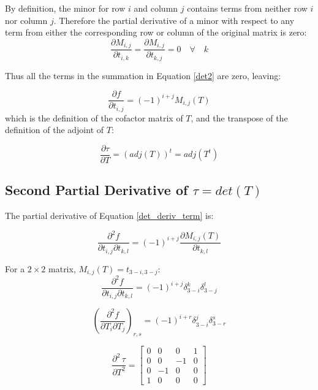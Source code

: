 \documentclass{report}
\begin{document}
\noindent By definition, the minor for row $i$ and column $j$ contains terms from neither row $i$ nor column $j$. Therefore the partial derivative of a minor with respect to any term from either the corresponding row or column of the original matrix is zero:
\begin{equation}\label{det3}
\frac{\partial M_{i,j}}{\partial t_{i,k}} = 
\frac{\partial M_{i,j}}{\partial t_{k,j}} = 0 \quad \forall \quad k
\end{equation}

\noindent Thus all the terms in the summation in Equation \ref{det2} are zero, leaving:

\begin{equation}\label{det_deriv_term}
\frac{\partial f}{\partial t_{i,j}} = (-1)^{i+j}M_{i,j}(T)
\end{equation}
which is the definition of the cofactor matrix of $T$, and the transpose of the definition of the adjoint of $T$:

\begin{equation}
\label{adjform}
\frac{\partial \tau}{\partial T} = (adj(T))^t = adj(T^t)
\end{equation}

\subsection{Second Partial Derivative of $\tau=det(T)$}

The partial derivative of Equation \ref{det_deriv_term} is:

\begin{equation}
\frac{\partial^2 f}{\partial t_{i,j} \partial t_{k,l}} = (-1)^{i+j}\frac{\partial M_{i,j}(T)}{\partial t_{k,l}}
\end{equation}

\noindent For a $2 \times 2$ matrix, $M_{i,j}(T) = t_{3-i,3-j}$:
\begin{equation}
\frac{\partial^2 f}{\partial t_{i,j} \partial t_{k,l}} = 
(-1)^{i+j} \delta_{3-i}^k \delta_{3-j}^l
\end{equation}

\begin{equation}
\left(\frac{\partial^2 f}{\partial T_i \partial T_j}\right)_{r,s} =
(-1)^{i+r} \delta_{3-i}^j \delta_{3-r}^s
\end{equation}

\begin{equation}
\label{2ndtau2d}
\frac{\partial^2 \, \tau}{\partial T^2} =
\left[ \begin{array}{cccc}
0 & 0 & 0 & 1 \\
0 & 0 & -1 & 0 \\
0 & -1 & 0 & 0 \\
1 & 0 & 0 & 0 
\end{array} \right]
\end{equation}
\end{document}
